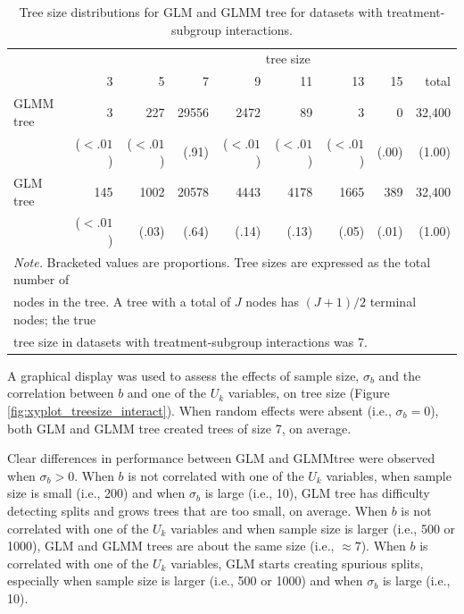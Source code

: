 \documentclass[nobf,doc]{apa}
\begin{document}
\begin{table}[!htbp]
\caption{Tree size distributions for GLM and GLMM tree for datasets with treatment-subgroup interactions.}
\small
\begin{tabular}{lrrrrrrrr}
	\thickline
	&&\multicolumn{7}{c}{tree size}\\
	\cline{2-8}
	&     3   &   5   &   7   &   9   &  11  &   13   &   15  & total \\
	\hline
  	GLMM tree	& 3 & 227& 29556 & 2472 & 89 & 3 &0& 32,400 \\
				&  ($<.01$)  & ($<.01$)& (.91) & ($<.01$) & ($<.01$) & ($<.01$) &(.00)& (1.00) \\

  	GLM tree		& 145 & 1002 & 20578 & 4443 & 4178 & 1665 & 389 & 32,400\\ 
 			 	& ($<.01$) & (.03) & (.64) & (.14) & (.13) & (.05) & (.01) & (1.00) \\ 
	\hline
  	\multicolumn{9}{l}{\textit{Note. } Bracketed values are proportions. Tree sizes are expressed as the total number of}\\
  	\multicolumn{9}{l}{nodes in the tree. A tree with a total of $J$ nodes has $(J+1)/2$ terminal nodes; the true}\\	
  	\multicolumn{8}{l}{tree size in datasets with treatment-subgroup interactions was 7.}\\
\end{tabular}
\label{tab:treesize_interactions}
\end{table}
 
A graphical display was used to assess the effects of sample size, $\sigma_b$ and the correlation between $b$ and one of the $U_k$ variables, on tree size (Figure \ref{fig:xyplot_treesize_interact}). When random effects were absent (i.e., $\sigma_{b}=0$), both GLM and GLMM tree created trees of size 7, on average. 

Clear differences in performance between GLM and GLMMtree were observed when $\sigma_b > 0$. When $b$ is not correlated with one of the $U_k$ variables, when sample size is small (i.e., 200) and when $\sigma_b$ is large (i.e., 10), GLM tree has difficulty detecting splits and grows trees that are too small, on average. When $b$ is not correlated with one of the $U_k$ variables and when sample size is larger (i.e., 500 or 1000), GLM and GLMM trees are about the same size (i.e., $\approx 7$). When $b$ is correlated with one of the $U_k$ variables, GLM starts creating spurious splits, especially when sample size is larger (i.e., 500 or 1000) and when $\sigma_b$ is large (i.e., 10).  
\end{document}
